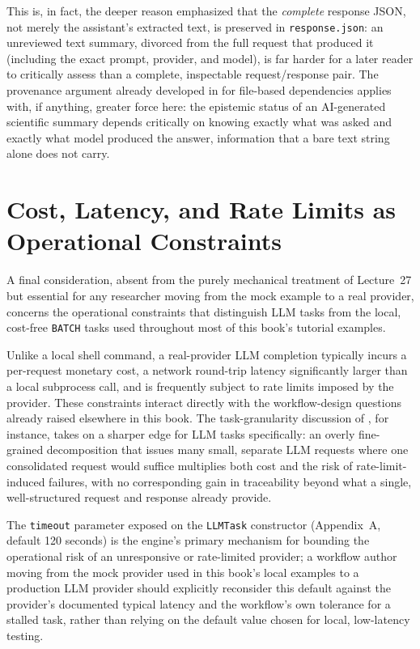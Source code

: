 This is, in fact, the deeper reason  emphasized that the
\emph{complete} response JSON, not merely the assistant's extracted text, is
preserved in \texttt{response.json}: an unreviewed text summary, divorced
from the full request that produced it (including the exact prompt,
provider, and model), is far harder for a later reader to critically assess
than a complete, inspectable request/response pair. The provenance argument
already developed in  for file-based dependencies applies
with, if anything, greater force here: the epistemic status of an
AI-generated scientific summary depends critically on knowing exactly what
was asked and exactly what model produced the answer, information that a
bare text string alone does not carry.

\section{Cost, Latency, and Rate Limits as Operational Constraints}

A final consideration, absent from the purely mechanical treatment of
Lecture~27 but essential for any researcher moving from the mock example to a
real provider, concerns the operational constraints that distinguish LLM
tasks from the local, cost-free \texttt{BATCH} tasks used throughout most of
this book's tutorial examples.

Unlike a local shell command, a real-provider LLM completion typically
incurs a per-request monetary cost, a network round-trip latency
significantly larger than a local subprocess call, and is frequently
subject to rate limits imposed by the provider. These constraints interact
directly with the workflow-design questions already raised elsewhere in
this book. The task-granularity discussion of ,
for instance, takes on a sharper edge for LLM tasks specifically: an
overly fine-grained decomposition that issues many small, separate LLM
requests where one consolidated request would suffice multiplies both cost
and the risk of rate-limit-induced failures, with no corresponding gain in
traceability beyond what a single, well-structured request and response
already provide.

\begin{practicebox}
The \texttt{timeout} parameter exposed on the \texttt{LLMTask} constructor
(Appendix~A, default 120 seconds) is the engine's primary mechanism for
bounding the operational risk of an unresponsive or rate-limited provider;
a workflow author moving from the mock provider used in this book's local
examples to a production LLM provider should explicitly reconsider this
default against the provider's documented typical latency and the
workflow's own tolerance for a stalled task, rather than relying on the
default value chosen for local, low-latency testing.
\end{practicebox}

